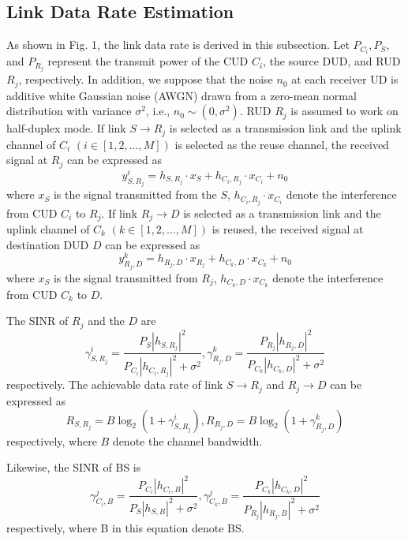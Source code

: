 \documentclass[conference]{IEEEtran}
\begin{document}
\subsection{Link Data Rate Estimation}
As shown in Fig. 1, the link data rate is derived in this subsection. Let $P_{C_i},P_S$, and $P_{R_j}$ represent the transmit power of the CUD $C_i$, the source DUD, and RUD $R_j$, respectively. In addition, we suppose that the noise $n_0$ at each receiver UD is additive white Gaussian noise (AWGN) drawn from a zero-mean normal distribution with variance $\sigma^2$, i.e., $n_0 \sim (0,\sigma^2)$. RUD $R_j$ is assumed to work on half-duplex mode. If link $S \rightarrow R_j$ is selected as a transmission link and the uplink channel of $C_i$ $(i \in [1,2,\ldots,M])$ is selected as the reuse channel, the received signal at $R_j$ can be expressed as
\begin{equation}
y^i_{S,R_j} = h_{S,R_j}\cdot x_S + h_{C_i,R_j}\cdot x_{C_i} + n_0
\end{equation}
where $x_S$ is the signal transmitted from the $S$, $h_{C_i,R_j}\cdot x_{C_i}$ denote the interference from CUD $C_i$ to $R_j$. If link $R_j \rightarrow D$ is selected as a transmission link and the uplink channel of $C_k$ $(k \in [1,2,\ldots,M])$ is reused, the received signal at destination DUD $D$ can be expressed as
\begin{equation}
y^k_{R_j,D} = h_{R_j,D}\cdot x_{R_j} + h_{C_k,D}\cdot x_{C_k} + n_0
\end{equation}
where $x_S$ is the signal transmitted from $R_j$, $h_{C_k,D}\cdot x_{C_k}$ denote the interference from CUD $C_k$ to $D$.

The SINR of $R_j$ and the $D$ are
\begin{equation}
\gamma^{i}_{S,R_j} = \frac{P_S|{h_{S,R_j}}|^{2}}{P_{C_i}|{h_{C_i,R_j}}|^{2} + \sigma^2} ,\gamma^{k}_{R_j,D} = \frac{P_{R_j}|{h_{R_j,D}}|^{2}}{P_{C_k}|{h_{C_k,D}}|^{2} + \sigma^2}
\end{equation}
respectively. The achievable data rate of link $S \rightarrow R_j$ and $R_j \rightarrow D$ can be expressed as
\begin{equation}
R_{S,R_j} = B\log_2(1 + \gamma^{i}_{S,R_{j}}),R_{R_j,D} = B\log_2(1 + \gamma^{k}_{R_j,D})
\end{equation}
respectively, where $B$ denote the channel bandwidth.

Likewise, the SINR of BS is
\begin{equation}
\gamma^{j}_{C_i,B} = \frac{P_{C_i}|{h_{C_i,B}}|^{2}}{P_S|{h_{S,B}}|^{2} + \sigma^2} ,\gamma^{j}_{C_k,B} = \frac{P_{C_k}|{h_{C_k,D}}|^{2}}{P_{R_j}|{h_{R_j,B}}|^{2} + \sigma^2}
\end{equation}
respectively, where B in this equation denote BS.
\end{document}
